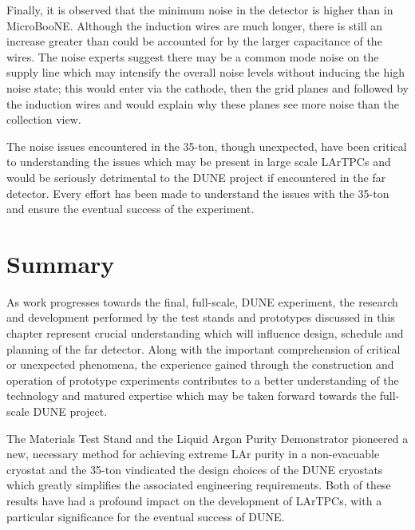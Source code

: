 Finally, it is observed that the minimum noise in the detector is higher than in MicroBooNE.  Although the induction wires are much longer, there is still an increase greater than could be accounted for by the larger capacitance of the wires.  The noise experts suggest there may be a common mode noise on the supply line which may intensify the overall noise levels without inducing the high noise state; this would enter via the cathode, then the grid planes and followed by the induction wires and would explain why these planes see more noise than the collection view.

The noise issues encountered in the 35-ton, though unexpected, have been critical to understanding the issues which may be present in large scale LArTPCs and would be seriously detrimental to the DUNE project if encountered in the far detector.  Every effort has been made to understand the issues with the 35-ton and ensure the eventual success of the experiment.

\section{Summary}\label{sec:35tonSummary}

As work progresses towards the final, full-scale, DUNE experiment, the research and development performed by the test stands and prototypes discussed in this chapter represent crucial understanding which will influence design, schedule and planning of the far detector.  Along with the important comprehension of critical or unexpected phenomena, the experience gained through the construction and operation of prototype experiments contributes to a better understanding of the technology and matured expertise which may be taken forward towards the full-scale DUNE project.

The Materials Test Stand and the Liquid Argon Purity Demonstrator pioneered a new, necessary method for achieving extreme LAr purity in a non-evacuable cryostat and the 35-ton vindicated the design choices of the DUNE cryostats which greatly simplifies the associated engineering requirements.  Both of these results have had a profound impact on the development of LArTPCs, with a particular significance for the eventual success of DUNE.

